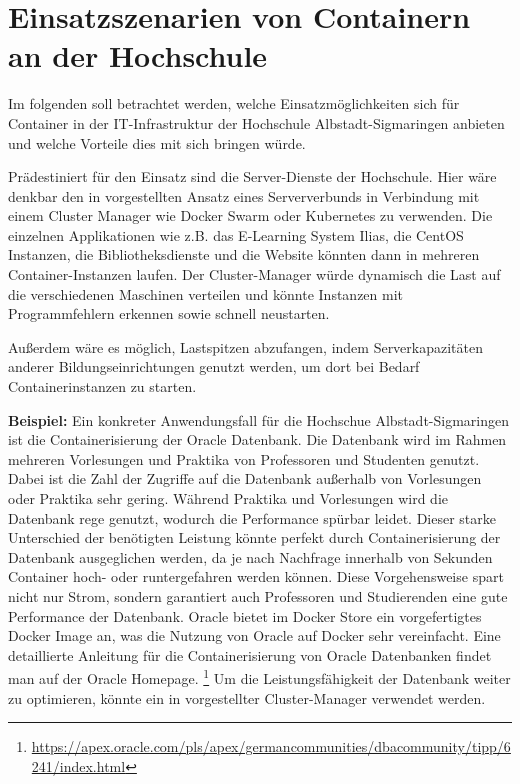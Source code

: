 \section{Einsatzszenarien von Containern an der Hochschule}
\label{sec:HS}
Im folgenden soll betrachtet werden, welche Einsatzmöglichkeiten sich für Container in der IT-Infrastruktur der Hochschule Albstadt-Sigmaringen anbieten und welche Vorteile dies mit sich bringen würde. 

Prädestiniert für den Einsatz sind die Server-Dienste der Hochschule.
Hier wäre denkbar den in  vorgestellten Ansatz eines Serververbunds in Verbindung mit einem Cluster Manager wie Docker Swarm oder Kubernetes zu verwenden.
Die einzelnen Applikationen wie z.B. das E-Learning System Ilias, die CentOS Instanzen, die Bibliotheksdienste und die Website könnten dann in mehreren Container-Instanzen laufen.
Der Cluster-Manager würde dynamisch die Last auf die verschiedenen Maschinen verteilen und könnte Instanzen mit Programmfehlern erkennen sowie schnell neustarten.

Außerdem wäre es möglich, Lastspitzen abzufangen, indem Serverkapazitäten anderer Bildungseinrichtungen genutzt werden, um dort bei Bedarf Containerinstanzen zu starten.

\textbf{Beispiel:}\newline
Ein konkreter Anwendungsfall für die Hochschue Albstadt-Sigmaringen ist die Containerisierung der Oracle Datenbank. Die Datenbank wird im Rahmen mehreren Vorlesungen und Praktika von Professoren und Studenten genutzt.
Dabei ist die Zahl der Zugriffe auf die Datenbank außerhalb von Vorlesungen oder Praktika sehr gering.
Während Praktika und Vorlesungen wird die Datenbank rege genutzt, wodurch die Performance spürbar leidet.
Dieser starke Unterschied der benötigten Leistung könnte perfekt durch Containerisierung der Datenbank ausgeglichen werden, da je nach Nachfrage innerhalb von Sekunden Container hoch- oder runtergefahren werden können.
Diese Vorgehensweise spart nicht nur Strom, sondern garantiert auch Professoren und Studierenden eine gute Performance der Datenbank. Oracle bietet im Docker Store ein vorgefertigtes Docker Image an, was die Nutzung von Oracle auf Docker sehr vereinfacht.
Eine detaillierte Anleitung für die Containerisierung von Oracle Datenbanken findet man auf der Oracle Homepage.
\footnote{\url{https://apex.oracle.com/pls/apex/germancommunities/dbacommunity/tipp/6241/index.html}}
Um die Leistungsfähigkeit der Datenbank weiter zu optimieren, könnte ein in  vorgestellter Cluster-Manager verwendet werden.
